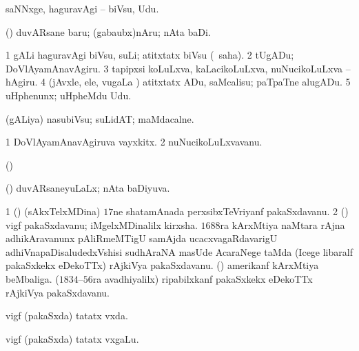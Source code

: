 {{{{{{\bentry
{} 
\gl{\sakirx}
\expl{}
\bmng
saNNxge, haguravAgi -- biVsu, Udu. 
\emng

\noindent 
\gl{\akirx}
\expl{}
\bmng
(\birx) duvARsane baru; (gabaubx)nAru; nAta baDi. 
\emng
\eentry

\bentry
{} 
\gl{\akirx}
\expl{}
\bmng
\bnum
\num{1} gALi haguravAgi biVsu, suLi; atitxtatx biVsu (\sakirx\ saha). 
\num{2} tUgADu; DoVlAyamAnavAgiru. 
\num{3} tapipxsi koLuLxva, kaLacikoLuLxva, nuNucikoLuLxva -- hAgiru. 
\num{4} (jAvxle, ele, \mo vugaLa \vi) atitxtatx ADu, saMcalisu; paTpaTne alugADu. 
\num{5} uHphenunx; uHpheMdu Udu. 
\enum
\emng
\eentry

\bentry
{} 
\gl{\nA}
\expl{}
\bmng
(gALiya) nasubiVsu; suLidAT; maMdacalne. 
\emng
\eentry

\bentry
{} 
\gl{\nA}
\expl{}
\bmng
\bnum
\num{1} DoVlAyamAnavAgiruva vayxkitx. 
\num{2} nuNucikoLuLxvavanu. 
\enum
\emng
\eentry

\bentry
{} 
\gl{\nA}
\expl{}
\bmng
(\ame)  
\emng
\eentry

\bentry
{} 
\gl{\gu}
\bmng
(\AmA) duvARsaneyuLaLx; nAta baDiyuva. 
\emng
\eentry

\bentry
{} 
\gl{\nA}
\expl{}
\bmng
\bnum
\num{1} (\ca) (sAkxTelxMDina) $17$ne shatamAnada perxsibxTeVriyanf pakaSxdavanu. 
\num{2} (\rAshA) vigf pakaSxdavanu; iMgelxMDinalilx kirxsha. $1688$ra kArxMtiya naMtara rAjna adhikAravanunx pAliRmeMTigU samAjda ucacxvagaRdavarigU adhiVnapaDisaludedxVshisi sudhAraNA masUde AcaraNege taMda (Icege libaralf pakaSxkekx eDekoTTx) rAjkiVya pakaSxdavanu. 
 (\ame) 
\banum
{} amerikanf kArxMtiya beMbaliga. 
 ($1834$--$56$ra avadhiyalilx) ripabilxkanf pakaSxkekx eDekoTTx rAjkiVya pakaSxdavanu. 
\eanum
\numie
\enum
\emng
\eentry

\bentry
{} 
\gl{\nA}
\expl{}
\bmng
{} 
\emng
\eentry

\bentry
{} 
\gl{\gu}
\expl{}
\bmng
vigf (pakaSxda) tatatx vxda. 
\emng
\eentry

\bentry
{} 
\gl{\nA}
\expl{}
\bmng
vigf (pakaSxda) tatatx vxgaLu. 
\emng
\eentry

}}}}}}
